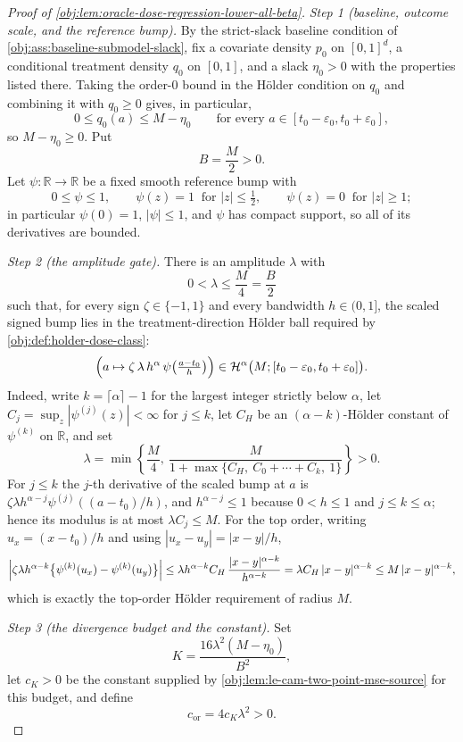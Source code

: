 \begin{proof}[Proof of \cref{obj:lem:oracle-dose-regression-lower-all-beta}]
\emph{Step 1 (baseline, outcome scale, and the reference bump).} By the strict-slack baseline
condition of \cref{obj:ass:baseline-submodel-slack}, fix a covariate density \(p_0\) on
\([0,1]^d\), a conditional treatment density \(q_0\) on \([0,1]\), and a slack \(\eta_0>0\) with the
properties listed there. Taking the order-\(0\) bound in the Hölder condition on \(q_0\) and
combining it with \(q_0\ge 0\) gives, in particular,
\[
0\le q_0(a)\le M-\eta_0
\qquad\text{for every }a\in[t_0-\varepsilon_0,t_0+\varepsilon_0],
\]
so \(M-\eta_0\ge 0\). Put
\[
B=\frac M2>0 .
\]
Let \(\psi:\mathbb R\to\mathbb R\) be a fixed smooth reference bump with
\[
0\le\psi\le 1,
\qquad
\psi(z)=1\ \text{ for }|z|\le\tfrac12,
\qquad
\psi(z)=0\ \text{ for }|z|\ge 1 ;
\]
in particular \(\psi(0)=1\), \(|\psi|\le 1\), and \(\psi\) has compact support, so all of its
derivatives are bounded. %

\emph{Step 2 (the amplitude gate).} There is an amplitude \(\lambda\) with
\[
0<\lambda\le\frac M4=\frac B2
\]
such that, for every sign \(\zeta\in\{-1,1\}\) and every bandwidth \(h\in(0,1]\), the scaled signed
bump lies in the treatment-direction Hölder ball required by \cref{obj:def:holder-dose-class}:
\[
\Bigl(a\mapsto \zeta\,\lambda\,h^{\alpha}\,\psi\!\left(\tfrac{a-t_0}{h}\right)\Bigr)
\in
\mathcal H^{\alpha}\bigl(M;[t_0-\varepsilon_0,t_0+\varepsilon_0]\bigr).
\]
Indeed, write \(k=\lceil\alpha\rceil-1\) for the largest integer strictly below \(\alpha\), let
\(C_j=\sup_z|\psi^{(j)}(z)|<\infty\) for \(j\le k\), let \(C_H\) be an \((\alpha-k)\)-Hölder constant of
\(\psi^{(k)}\) on \(\mathbb R\), and set
\[
\lambda=\min\left\{\frac M4,\ \frac{M}{1+\max\{C_H,\ C_0+\cdots+C_k,\ 1\}}\right\}>0 .
\]
For \(j\le k\) the \(j\)-th derivative of the scaled bump at \(a\) is
\(\zeta\lambda h^{\alpha-j}\psi^{(j)}((a-t_0)/h)\), and \(h^{\alpha-j}\le 1\) because \(0<h\le1\) and
\(j\le k\le\alpha\); hence its modulus is at most \(\lambda C_j\le M\). For the top order, writing
\(u_x=(x-t_0)/h\) and using \(|u_x-u_y|=|x-y|/h\),
\[
\Bigl|\zeta\lambda h^{\alpha-k}\bigl\{\psi^{(k)}(u_x)-\psi^{(k)}(u_y)\bigr\}\Bigr|
\le
\lambda h^{\alpha-k}C_H\,\frac{|x-y|^{\alpha-k}}{h^{\alpha-k}}
=
\lambda C_H\,|x-y|^{\alpha-k}
\le
M\,|x-y|^{\alpha-k},
\]
which is exactly the top-order Hölder requirement of radius \(M\). %

\emph{Step 3 (the divergence budget and the constant).} Set
\[
K=\frac{16\lambda^2(M-\eta_0)}{B^2},
\]
let \(c_K>0\) be the constant supplied by \cref{obj:lem:le-cam-two-point-mse-source} for this budget,
and define
\[
c_{\mathrm{or}}=4c_K\lambda^2>0 .
\]


\end{proof}

